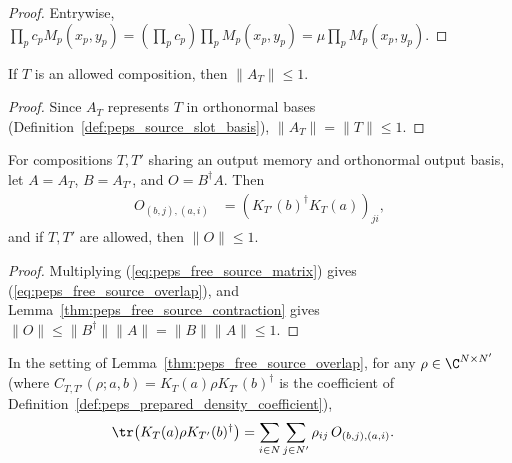\begin{proof}\leanok
    Entrywise, $\prod_p c_pM_p(x_p,y_p)=(\prod_p c_p)\prod_p M_p(x_p,y_p)=\mu\prod_p M_p(x_p,y_p)$.
\end{proof}

\begin{lemma}
    \label{thm:peps_free_source_contraction}
    \leanok
    If $T$ is an allowed composition, then $\|A_T\|\le1$.
\end{lemma}

\begin{proof}\leanok
    Since $A_T$ represents $T$ in orthonormal bases
    (Definition~\ref{def:peps_source_slot_basis}), $\|A_T\|=\|T\|\le 1$.
\end{proof}

\begin{lemma}
    \label{thm:peps_free_source_overlap}
    \leanok
    For compositions $T,T'$ sharing an output memory and orthonormal output
    basis, let $A=A_T$, $B=A_{T'}$, and $O=B^\dagger A$. Then
    \begin{align}
        O_{(b,j),(a,i)} & =(K_{T'}(b)^\dagger K_T(a))_{ji},
        \label{eq:peps_free_source_overlap}
    \end{align}
    and if $T,T'$ are allowed, then $\|O\|\le1$.
\end{lemma}

\begin{proof}\leanok
    Multiplying (\ref{eq:peps_free_source_matrix}) gives
    (\ref{eq:peps_free_source_overlap}), and Lemma~\ref{thm:peps_free_source_contraction}
    gives $\|O\|\le\|B^\dagger\|\|A\|=\|B\|\|A\|\le1$.
\end{proof}

\begin{lemma}
    \label{thm:peps_free_source_trace}
    \leanok
    In the setting of Lemma~\ref{thm:peps_free_source_overlap}, for any
    $\rho\in\C^{N\times N'}$ (where $C_{T,T'}(\rho;a,b)=K_T(a)\rho K_{T'}(b)^\dagger$
    is the coefficient of Definition~\ref{def:peps_prepared_density_coefficient}),
    \begin{align}
        \tr\bigl(K_T(a)\rho K_{T'}(b)^\dagger\bigr)
         & =\sum_{i\in N}\sum_{j\in N'}
        \rho_{ij}\,O_{(b,j),(a,i)}.
        \label{eq:peps_free_source_trace}
    \end{align}
\end{lemma}

